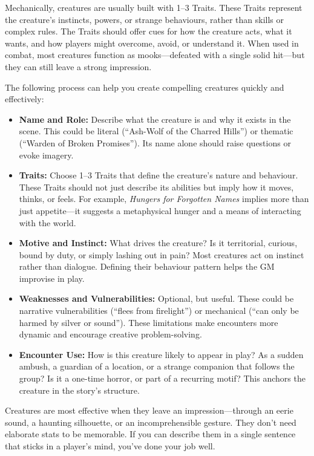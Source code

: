 Mechanically, creatures are usually built with 1–3 Traits. These Traits represent the creature’s instincts, powers, or strange behaviours, rather than skills or complex rules. The Traits should offer cues for how the creature acts, what it wants, and how players might overcome, avoid, or understand it. When used in combat, most creatures function as mooks—defeated with a single solid hit—but they can still leave a strong impression.

The following process can help you create compelling creatures quickly and effectively:

\begin{itemize}
  \item \textbf{Name and Role:} Describe what the creature is and why it exists in the scene. This could be literal (``Ash-Wolf of the Charred Hills'') or thematic (``Warden of Broken Promises''). Its name alone should raise questions or evoke imagery.

  \item \textbf{Traits:} Choose 1–3 Traits that define the creature’s nature and behaviour. These Traits should not just describe its abilities but imply how it moves, thinks, or feels. For example, \emph{Hungers for Forgotten Names} implies more than just appetite—it suggests a metaphysical hunger and a means of interacting with the world.

  \item \textbf{Motive and Instinct:} What drives the creature? Is it territorial, curious, bound by duty, or simply lashing out in pain? Most creatures act on instinct rather than dialogue. Defining their behaviour pattern helps the GM improvise in play.

  \item \textbf{Weaknesses and Vulnerabilities:} Optional, but useful. These could be narrative vulnerabilities (``flees from firelight'') or mechanical (``can only be harmed by silver or sound''). These limitations make encounters more dynamic and encourage creative problem-solving.

  \item \textbf{Encounter Use:} How is this creature likely to appear in play? As a sudden ambush, a guardian of a location, or a strange companion that follows the group? Is it a one-time horror, or part of a recurring motif? This anchors the creature in the story’s structure.
\end{itemize}

Creatures are most effective when they leave an impression—through an eerie sound, a haunting silhouette, or an incomprehensible gesture. They don’t need elaborate stats to be memorable. If you can describe them in a single sentence that sticks in a player’s mind, you’ve done your job well.

